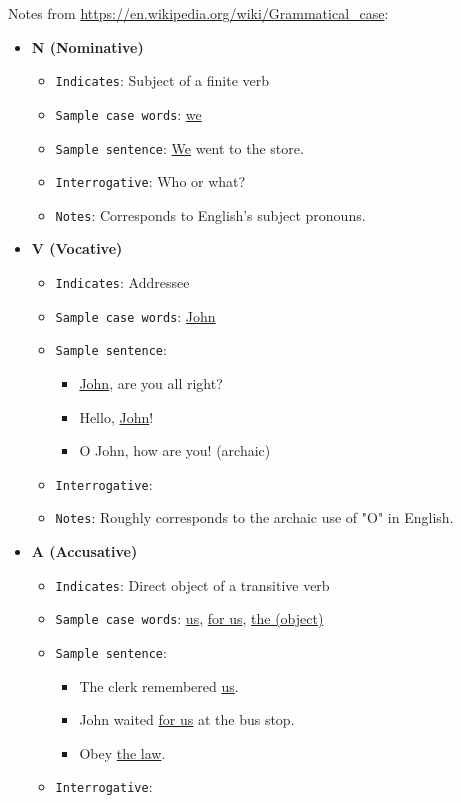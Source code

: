 \documentclass[11pt]{article}
\begin{document}
Notes from \url{https://en.wikipedia.org/wiki/Grammatical\_case}:

\begin{itemize}
\item \textbf{N (Nominative)}
\begin{itemize}
\item \texttt{Indicates}: Subject of a finite verb
\item \texttt{Sample case words}: \uline{we}
\item \texttt{Sample sentence}: \uline{We} went to the store.
\item \texttt{Interrogative}: Who or what?
\item \texttt{Notes}: Corresponds to English's subject pronouns.
\end{itemize}
\item \textbf{V (Vocative)}
\begin{itemize}
\item \texttt{Indicates}: Addressee
\item \texttt{Sample case words}: \uline{John}
\item \texttt{Sample sentence}:
\begin{itemize}
\item \uline{John}, are you all right?
\item Hello, \uline{John}!
\item O John, how are you! (archaic)
\end{itemize}
\item \texttt{Interrogative}:
\item \texttt{Notes}: Roughly corresponds to the archaic use of "O" in English.
\end{itemize}
\item \textbf{A (Accusative)}
\begin{itemize}
\item \texttt{Indicates}: Direct object of a transitive verb
\item \texttt{Sample case words}: \uline{us}, \uline{for us}, \uline{the (object)}
\item \texttt{Sample sentence}:
\begin{itemize}
\item The clerk remembered \uline{us}.
\item John waited \uline{for us} at the bus stop.
\item Obey \uline{the law}.
\end{itemize}
\item \texttt{Interrogative}:
\begin{itemize}

\end{itemize}
\end{itemize}
\end{itemize}
\end{document}
